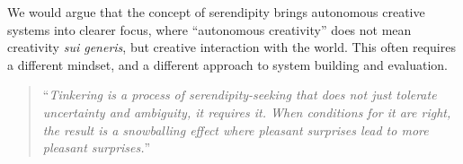 We would argue that the concept of serendipity brings autonomous
creative systems into clearer focus, where ``autonomous creativity''
does not mean creativity \emph{sui generis}, but creative interaction
with the world.  This often requires a different mindset, and a
different approach to system building and evaluation.
\begin{quote}
``\emph{Tinkering is a process of serendipity-seeking that does not
    just tolerate uncertainty and ambiguity, it requires it.  When
    conditions for it are right, the result is a snowballing effect
    where pleasant surprises lead to more pleasant surprises.}''
  \cite[``Tinkering versus Goals'']{rao2015breaking}


\end{quote}


